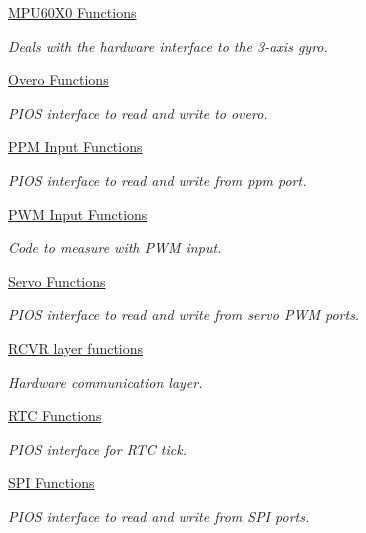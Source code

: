 \begin{DoxyCompactItemize}
\hyperlink{group___p_i_o_s___m_p_u60_x0}{\-M\-P\-U60\-X0 Functions}
\begin{DoxyCompactList}\small\item\em \-Deals with the hardware interface to the 3-\/axis gyro. \end{DoxyCompactList}\item 
\hyperlink{group___p_i_o_s___o_v_e_r_o}{\-Overo Functions}
\begin{DoxyCompactList}\small\item\em \-P\-I\-O\-S interface to read and write to overo. \end{DoxyCompactList}\item 
\hyperlink{group___p_i_o_s___p_p_m}{\-P\-P\-M Input Functions}
\begin{DoxyCompactList}\small\item\em \-P\-I\-O\-S interface to read and write from ppm port. \end{DoxyCompactList}\item 
\hyperlink{group___p_i_o_s___p_w_m}{\-P\-W\-M Input Functions}
\begin{DoxyCompactList}\small\item\em \-Code to measure with \-P\-W\-M input. \end{DoxyCompactList}\item 
\hyperlink{group___p_i_o_s___s_e_r_v_o}{\-Servo Functions}
\begin{DoxyCompactList}\small\item\em \-P\-I\-O\-S interface to read and write from servo \-P\-W\-M ports. \end{DoxyCompactList}\item 
\hyperlink{group___p_i_o_s___r_c_v_r}{\-R\-C\-V\-R layer functions}
\begin{DoxyCompactList}\small\item\em \-Hardware communication layer. \end{DoxyCompactList}\item 
\hyperlink{group___p_i_o_s___r_t_c}{\-R\-T\-C Functions}
\begin{DoxyCompactList}\small\item\em \-P\-I\-O\-S interface for \-R\-T\-C tick. \end{DoxyCompactList}\item 
\hyperlink{group___p_i_o_s___s_p_i}{\-S\-P\-I Functions}
\begin{DoxyCompactList}\small\item\em \-P\-I\-O\-S interface to read and write from \-S\-P\-I ports. \end{DoxyCompactList}\item 

\end{DoxyCompactItemize}
